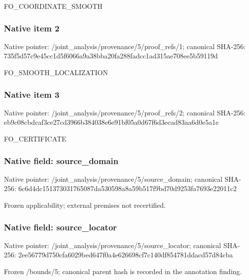 \documentclass[10pt,a4paper]{article}
\begin{document}
\begingroup\raggedright\sloppy FO\_\allowbreak{}COORDINATE\_\allowbreak{}SMOOTH\par\endgroup

\subsubsection{Native item 2}
Native pointer: /joint\_\allowbreak{}analysis/provenance/5/proof\_\allowbreak{}refs/1; canonical SHA-256: 735f5d57c9e45cc1d5f6066a9a38bba20fa288fadcc1ad315ae708ee5b59119d

\begingroup\raggedright\sloppy FO\_\allowbreak{}SMOOTH\_\allowbreak{}LOCALIZATION\par\endgroup

\subsubsection{Native item 3}
Native pointer: /joint\_\allowbreak{}analysis/provenance/5/proof\_\allowbreak{}refs/2; canonical SHA-256: eb9c08cbdcaf3ce27cd3966b384038e6e91bf05a0d67f6d3ecad83aa6d0e5a1e

\begingroup\raggedright\sloppy FO\_\allowbreak{}CERTIFICATE\par\endgroup

\subsubsection{Native field: source\_\allowbreak{}domain}
Native pointer: /joint\_\allowbreak{}analysis/provenance/5/source\_\allowbreak{}domain; canonical SHA-256: 6c6d4dc151373031765087da530598a8a59b517f9bd70d9253fa7693e22011c2

\begingroup\raggedright\sloppy Frozen applicability;\allowbreak{} external premises not recertified.\par\endgroup

\subsubsection{Native field: source\_\allowbreak{}locator}
Native pointer: /joint\_\allowbreak{}analysis/provenance/5/source\_\allowbreak{}locator; canonical SHA-256: 2ee56779d750cfa6029bed647f0a4e626698cf7c140df854781ddacd57d84cba

\begingroup\raggedright\sloppy Frozen /\allowbreak{}bounds/\allowbreak{}5;\allowbreak{} canonical parent hash is recorded in the annotation finding.\par\endgroup
\end{document}
